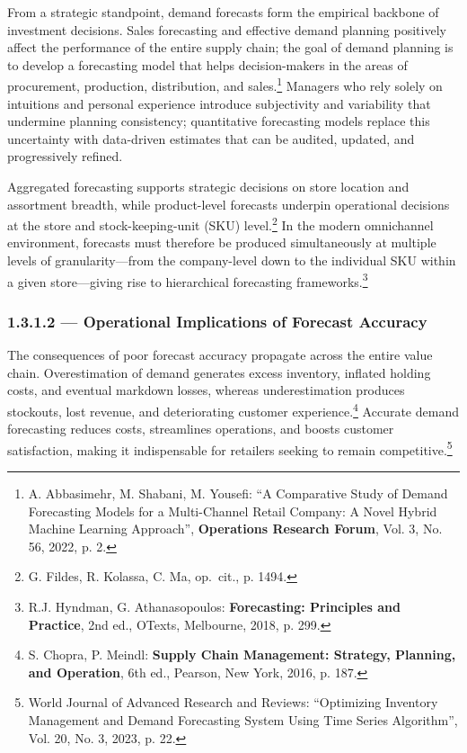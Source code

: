 From a strategic standpoint, demand forecasts form the empirical backbone
of investment decisions. Sales forecasting and effective demand planning
positively affect the performance of the entire supply chain; the goal of
demand planning is to develop a forecasting model that helps decision-makers
in the areas of procurement, production, distribution, and
sales.\footnote{A. Abbasimehr, M. Shabani, M. Yousefi: ``A Comparative
Study of Demand Forecasting Models for a Multi-Channel Retail Company:
A Novel Hybrid Machine Learning Approach'', \textbf{Operations Research
Forum}, Vol. 3, No. 56, 2022, p. 2.} Managers who rely solely on
intuitions and personal experience introduce subjectivity and variability
that undermine planning consistency; quantitative forecasting models
replace this uncertainty with data-driven estimates that can be audited,
updated, and progressively refined.

Aggregated forecasting supports strategic decisions on store location and
assortment breadth, while product-level forecasts underpin operational
decisions at the store and stock-keeping-unit (SKU) level.\footnote{G.
Fildes, R. Kolassa, C. Ma, op.\ cit., p. 1494.} In the modern
omnichannel environment, forecasts must therefore be produced simultaneously
at multiple levels of granularity—from the company-level down to the
individual SKU within a given store—giving rise to hierarchical forecasting
frameworks.\footnote{R.J. Hyndman, G. Athanasopoulos: \textbf{Forecasting:
Principles and Practice}, 2nd ed., OTexts, Melbourne, 2018, p. 299.}

\subsubsection{1.3.1.2 — Operational Implications of Forecast Accuracy}

The consequences of poor forecast accuracy propagate across the entire
value chain. Overestimation of demand generates excess inventory, inflated
holding costs, and eventual markdown losses, whereas underestimation
produces stockouts, lost revenue, and deteriorating customer
experience.\footnote{S. Chopra, P. Meindl: \textbf{Supply Chain
Management: Strategy, Planning, and Operation}, 6th ed., Pearson,
New York, 2016, p. 187.} Accurate demand forecasting reduces costs,
streamlines operations, and boosts customer satisfaction, making it
indispensable for retailers seeking to remain competitive.\footnote{World
Journal of Advanced Research and Reviews: ``Optimizing Inventory
Management and Demand Forecasting System Using Time Series Algorithm'',
Vol. 20, No. 3, 2023, p. 22.}

